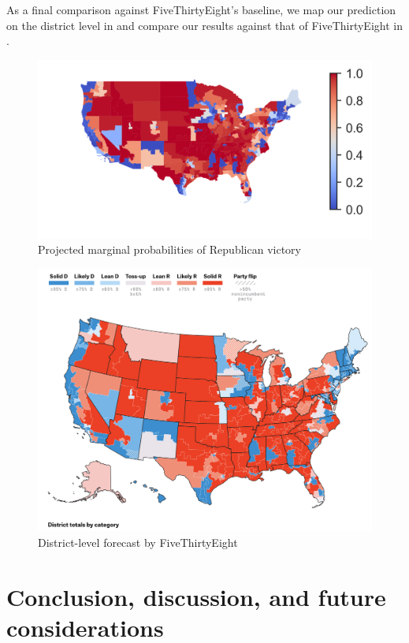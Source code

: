 \documentclass[11pt]{article}
\begin{document}
As a final comparison against FiveThirtyEight's baseline, we map our prediction on the district level in  and compare our results against that of FiveThirtyEight in .

\begin{figure}[tbh]
  \centering
  \includegraphics[scale=1.7]{projected_map.png}
  \caption{Projected marginal probabilities of Republican victory}
  \label{fig:proj_map}
\end{figure}

\begin{figure}[tbh]
  \centering
  \includegraphics[scale=0.45]{538_map}
  \caption{District-level forecast by FiveThirtyEight}
  \label{fig:538_map}
\end{figure}

\section{Conclusion, discussion, and future considerations}
\label{sec:conc} 



\end{document}
